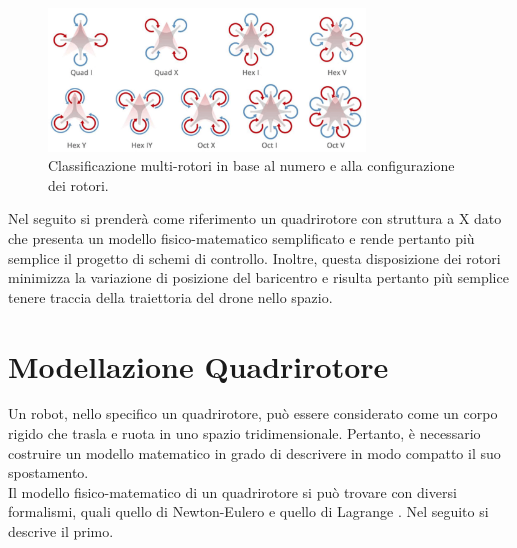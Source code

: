 \begin{figure}[H]
    \centering
    \includegraphics[width=0.75\textwidth]{gfx/drone_types}
    \caption[Classificazione multi-rotori.]{Classificazione multi-rotori in base al numero e alla configurazione dei rotori.}
    \label{fig:droneTypes}
\end{figure}

Nel seguito si prenderà come riferimento un quadrirotore con struttura a X dato che presenta un modello fisico-matematico semplificato e rende pertanto più semplice il progetto di schemi di controllo. Inoltre, questa disposizione dei rotori minimizza la variazione di posizione del baricentro e risulta pertanto più semplice tenere traccia della traiettoria del drone nello spazio.


\section{Modellazione Quadrirotore}
Un robot, nello specifico un quadrirotore, può essere considerato come un corpo rigido che trasla e ruota in uno spazio tridimensionale. Pertanto, è necessario costruire un modello matematico in grado di descrivere in modo compatto il suo spostamento.\\

Il modello fisico-matematico di un quadrirotore si può trovare con diversi formalismi, quali quello di Newton-Eulero e quello di Lagrange \cite{modelloQuad1} \cite{modelloQuad2} \cite{modelloQuad3}. Nel seguito si descrive il primo.\\

